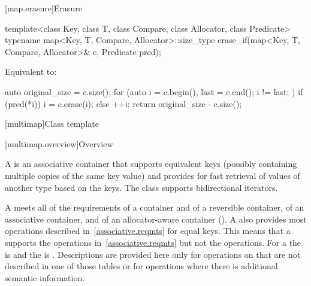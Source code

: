 [map.erasure]{Erasure}

%
\begin{itemdecl}
template<class Key, class T, class Compare, class Allocator, class Predicate>
  typename map<Key, T, Compare, Allocator>::size_type
    erase_if(map<Key, T, Compare, Allocator>& c, Predicate pred);
\end{itemdecl}

\begin{itemdescr}
\pnum
\effects
Equivalent to:
\begin{codeblock}
auto original_size = c.size();
for (auto i = c.begin(), last = c.end(); i != last; ) {
  if (pred(*i)) {
    i = c.erase(i);
  } else {
    ++i;
  }
}
return original_size - c.size();
\end{codeblock}
\end{itemdescr}

[multimap]{Class template }

[multimap.overview]{Overview}

\pnum
{}%
A
is an associative container that supports equivalent keys (possibly containing multiple copies of
the same key value) and provides for fast retrieval of values of another type
based on the keys.
The
class
supports bidirectional iterators.

\pnum
A
 meets all of the requirements of a container and of a
reversible container, of an associative
container, and of an allocator-aware container
().
A
also provides most operations described in~\ref{associative.reqmts}
for equal keys.
This means that a
supports the
operations in~\ref{associative.reqmts}
but not the
operations.
For a
the
is
and the
is
.
Descriptions are provided here only for operations on
that are not described in one of those tables
or for operations where there is additional semantic information.

